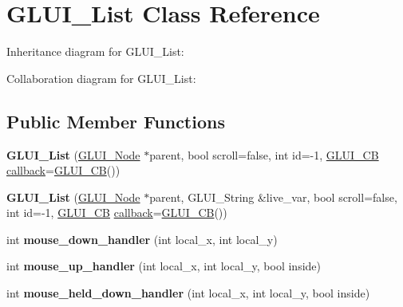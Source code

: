 \hypertarget{class_g_l_u_i___list}{\section{G\+L\+U\+I\+\_\+\+List Class Reference}
\label{class_g_l_u_i___list}
}


Inheritance diagram for G\+L\+U\+I\+\_\+\+List\+:


Collaboration diagram for G\+L\+U\+I\+\_\+\+List\+:
\subsection*{Public Member Functions}
\begin{DoxyCompactItemize}
\item 
\hypertarget{class_g_l_u_i___list_ab4db3ba18344aa8839022a2ec70eb637}{{\bfseries G\+L\+U\+I\+\_\+\+List} (\hyperlink{class_g_l_u_i___node}{G\+L\+U\+I\+\_\+\+Node} $\ast$parent, bool scroll=false, int id=-\/1, \hyperlink{class_g_l_u_i___c_b}{G\+L\+U\+I\+\_\+\+C\+B} \hyperlink{class_g_l_u_i___control_a96060fe0cc6d537e736dd6eef78e24ab}{callback}=\hyperlink{class_g_l_u_i___c_b}{G\+L\+U\+I\+\_\+\+C\+B}())}\label{class_g_l_u_i___list_ab4db3ba18344aa8839022a2ec70eb637}

\item 
\hypertarget{class_g_l_u_i___list_ae0558ab509470184c35c543c16e33626}{{\bfseries G\+L\+U\+I\+\_\+\+List} (\hyperlink{class_g_l_u_i___node}{G\+L\+U\+I\+\_\+\+Node} $\ast$parent, G\+L\+U\+I\+\_\+\+String \&live\+\_\+var, bool scroll=false, int id=-\/1, \hyperlink{class_g_l_u_i___c_b}{G\+L\+U\+I\+\_\+\+C\+B} \hyperlink{class_g_l_u_i___control_a96060fe0cc6d537e736dd6eef78e24ab}{callback}=\hyperlink{class_g_l_u_i___c_b}{G\+L\+U\+I\+\_\+\+C\+B}())}\label{class_g_l_u_i___list_ae0558ab509470184c35c543c16e33626}

\item 
\hypertarget{class_g_l_u_i___list_a5ea7f0e79c85acc1910b13222c2892c4}{int {\bfseries mouse\+\_\+down\+\_\+handler} (int local\+\_\+x, int local\+\_\+y)}\label{class_g_l_u_i___list_a5ea7f0e79c85acc1910b13222c2892c4}

\item 
\hypertarget{class_g_l_u_i___list_a7e96dff4df0bfdc5918c54a84f2d5052}{int {\bfseries mouse\+\_\+up\+\_\+handler} (int local\+\_\+x, int local\+\_\+y, bool inside)}\label{class_g_l_u_i___list_a7e96dff4df0bfdc5918c54a84f2d5052}

\item 
\hypertarget{class_g_l_u_i___list_a2ab77fda1915950e01bea87a45013311}{int {\bfseries mouse\+\_\+held\+\_\+down\+\_\+handler} (int local\+\_\+x, int local\+\_\+y, bool inside)}\label{class_g_l_u_i___list_a2ab77fda1915950e01bea87a45013311}


\end{DoxyCompactItemize}
